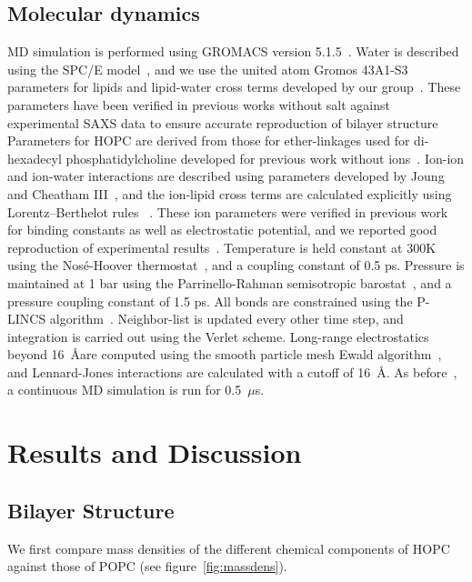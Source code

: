 \documentclass[12pt,preprint,times,openany,draft]{book}
\begin{document}
\subsection{Molecular dynamics}
MD simulation is performed using GROMACS version 5.1.5~\cite{abraham:2015,pall:2014,van:2005,lindahl:2001,berendsen:1995}. Water is described using 
the SPC/E model~\cite{spce}, and we use the united atom Gromos 43A1-S3 parameters for lipids and 
lipid-water cross terms developed by our group~\cite{chiu:2009, kruczek:2017:ether}. 
These parameters have been verified in previous works without salt 
against experimental SAXS data
to ensure accurate reproduction of bilayer structure~\cite{kruczek:2017:ether}
Parameters for HOPC are derived from those for ether-linkages used for di-hexadecyl phosphatidylcholine developed for previous work without ions~\cite{kruczek:2017:ether}.
Ion-ion and ion-water interactions are described using parameters developed by Joung and Cheatham III~\cite{joung:2008}, 
and the ion-lipid cross terms are calculated explicitly using Lorentz–Berthelot rules ~\cite{kruczek:2017}. These ion parameters
were verified in previous work for binding constants as well as electrostatic potential, and we reported good reproduction of experimental
results~\cite{kruczek:2017}. Temperature is held constant at 
300K using the Nos\'e-Hoover thermostat~\cite{nose:1983}, and a coupling constant of 0.5 ps. 
Pressure is maintained at 1 bar using the Parrinello-Rahman semisotropic barostat~\cite{parrinello:1981}, and 
a pressure coupling constant of 1.5 ps. 
All bonds are constrained using the P-LINCS algorithm~\cite{lincs}.
Neighbor-list is updated every other time step, and integration is carried out using the Verlet scheme. 
Long-range electrostatics beyond 16~\AA are computed using the smooth particle mesh Ewald algorithm~\cite{essmann:1995}, 
and Lennard-Jones interactions are calculated with a cutoff of 16~\AA.  As before~\cite{kruczek:2017}, a continuous MD simulation is run for 0.5~$\mu$s. 

\section{Results and Discussion}

\subsection{Bilayer Structure}

We first compare mass densities of the different chemical components of HOPC against those 
of POPC (see figure~\ref{fig:massdens}).  
\end{document}
